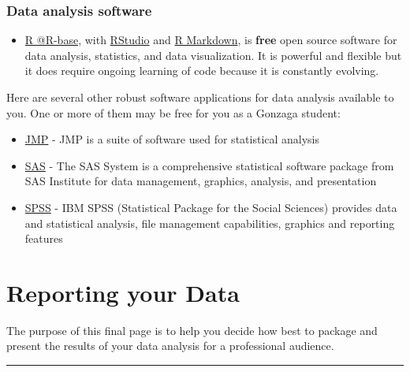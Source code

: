 \documentclass[
  letterpaper,
  DIV=11,
  numbers=noendperiod]{scrreprt}
\providecommand{\tightlist}{%
  \setlength{\itemsep}{0pt}\setlength{\parskip}{0pt}}\usepackage{longtable,booktabs,array}
\begin{document}
\hypertarget{data-analysis-software}{%
\subsection*{Data analysis software}\label{data-analysis-software}}

\begin{itemize}
\tightlist
\item
  \href{https://www.r-project.org/}{R @R-base}, with
  \href{https://www.rstudio.com/}{RStudio} and
  \href{https://rmarkdown.rstudio.com/}{R Markdown}, is \textbf{free}
  open source software for data analysis, statistics, and data
  visualization. It is powerful and flexible but it does require ongoing
  learning of code because it is constantly evolving.
\end{itemize}

Here are several other robust software applications for data analysis
available to you. One or more of them may be free for you as a Gonzaga
student:

\begin{itemize}
\tightlist
\item
  \href{https://itconnect.uw.edu/uware/jmp/}{JMP} - JMP is a suite of
  software used for statistical analysis
\item
  \href{https://itconnect.uw.edu/uware/sas/}{SAS} - The SAS System is a
  comprehensive statistical software package from SAS Institute for data
  management, graphics, analysis, and presentation
\item
  \href{https://itconnect.uw.edu/uware/spss/}{SPSS} - IBM SPSS
  (Statistical Package for the Social Sciences) provides data and
  statistical analysis, file management capabilities, graphics and
  reporting features
\end{itemize}


\hypertarget{reporting-your-data}{%
\chapter*{Reporting your Data}\label{reporting-your-data}}

The purpose of this final page is to help you decide how best to package
and present the results of your data analysis for a professional
audience.

\begin{center}\rule{0.5\linewidth}{0.5pt}\end{center}
\end{document}
